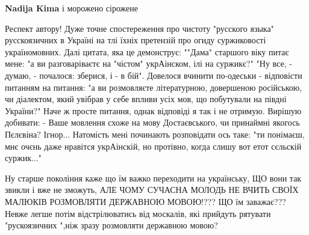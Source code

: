 \begin{itemize}
\begin{itemize}
 
\textbf{Nadija Kima} і морожено сірожене
\end{itemize}

 

\obeycr
Респект автору! Дуже точне спостереження про чистоту "русского языка" русскоязичних в Україні на тлі їхніх претензій про огиду суржиковості україномовних.
Далі цитата, яка це демонструє:
""Дама" старшого віку питає мене: "а ви разговаріваєтє на "чістом" укрАінском, ілі на суржикє?"
"Ну все, - думаю, - почалося: зберися, і - в бій".
Довелося вчинити по-одеськи - відповісти питанням на питання: "а ви розмовляєте літературною, довершеною російською, чи діалектом, який увібрав у себе впливи усіх мов, що побутували на півдні України?"
Наче ж просте питання, однак відповіді я так і не отримую.
Вирішую добивати:
- Ваше мовлення схоже на мову Достаєвського, чи принаймні якогось Пєлєвіна?
Ігнор... Натомість мені починають розповідати ось таке: "ти понімаєш, мнє очєнь даже нравітся укрАінскій, но протівно, когда слишу вот етот сєльскій суржик..."
\restorecr

 

Ну старше покоління каже що їм важко переходити на українську, ЩО вони так
звикли і вже не зможуть, АЛЕ ЧОМУ СУЧАСНА МОЛОДЬ НЕ ВЧИТЬ СВОЇХ МАЛЮКІВ
РОЗМОВЛЯТИ ДЕРЖАВНОЮ МОВОЮ!??? ЩО їм заважає??? Невже легше потім
відстрілюватись від москалів, які прийдуть рятувати "рускоязичних ",ніж зразу
розмовляти державною мовою?

\begin{itemize}
 

\end{itemize}
\end{itemize}
